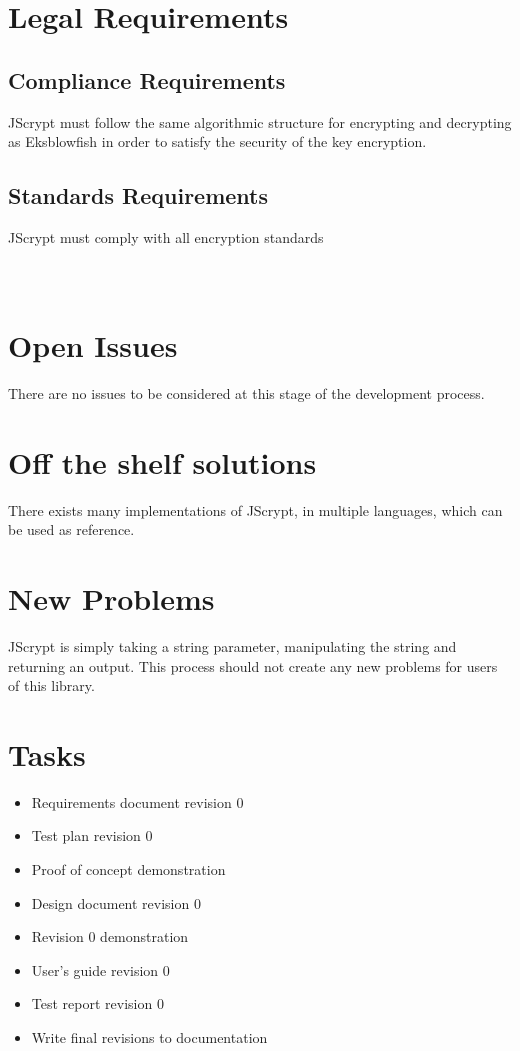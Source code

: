 \documentclass[12pt]{article}
\begin{document}
\section {Legal Requirements}

\subsection {Compliance Requirements}
JScrypt must follow the same algorithmic structure for encrypting and decrypting as Eksblowfish in order to satisfy the security of the key encryption.

\subsection {Standards Requirements}
JScrypt must comply with all encryption standards \\ \\ \\

\section*{}

\section {Open Issues}
There are no issues to be considered at this stage of the development process.

\section {Off the shelf solutions}
There exists many implementations of JScrypt, in multiple languages, which can be used as reference.

\section {New Problems}
JScrypt is simply taking a string parameter, manipulating the string and returning an output. This process should not create any new problems for users of this library.

\section {Tasks}
\begin{itemize}
	\item Requirements document revision 0
	\item Test plan revision 0
	\item Proof of concept demonstration
	\item Design document revision 0
	\item Revision 0 demonstration
	\item User's guide revision 0
	\item Test report revision 0
	\item Write final revisions to documentation
	\end{itemize}
\end{document}
